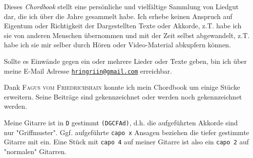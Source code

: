
\begin{center}
    { \large
        \begin{minipage}[h]{0.7\textwidth}
            \begin{tcolorbox}[colback=red!7,colframe=red!70!black,fonttitle=\bfseries,title=Disclaimer]
                Dieses \textit{Chordbook} stellt eine pers\"{o}nliche und vielf\"{a}ltige Sammlung von Liedgut dar, die ich \"{u}ber die Jahre gesammelt habe.
                Ich erhebe keinen Anspruch auf Eigentum oder Richtigkeit der Dargestellten Texte oder Akkorde, z.T. habe ich sie von anderen Menschen \"{u}bernommen und mit der Zeit selbst abgewandelt, z.T. habe ich sie mir selber durch H\"{o}ren oder Video-Material abkupfern k\"{o}nnen. \par\medskip

                Sollte es Einw\"{a}nde gegen ein oder mehrere Lieder oder Texte geben, bin ich \"{u}ber meine E-Mail Adresse \href{mailto:hringriin@gmail.com}{\texttt{hringriin@gmail.com}} erreichbar. \par\medskip

                Dank \textsc{Fagus vom Friedrichshain} konnte ich mein Chordbook um einige St\"{u}cke erweitern.
                Seine Beitr\"{a}ge sind gekennzeichnet oder werden noch gekennzeichnet werden.
            \end{tcolorbox}
        \end{minipage}
    }

            \vfill

    { \large
        \begin{minipage}[h]{0.7\textwidth}
            \begin{tcolorbox}[colback=red!7,colframe=red!70!black,fonttitle=\bfseries,title=Stimmung der Gitarre]
                Meine Gitarre ist in \texttt{D} gestimmt \texttt{(DGCFAd)}, d.h. die aufgeführten Akkorde sind nur "Griffmuster".
                Ggf. aufgeführte \texttt{capo x} Ansagen beziehen die tiefer gestimmte Gitarre mit ein.
                Eine Stück mit \texttt{capo 4} auf meiner Gitarre ist also ein \texttt{capo 2} auf "normalen" Gitarren.
            \end{tcolorbox}
        \end{minipage}
    }
\end{center}
